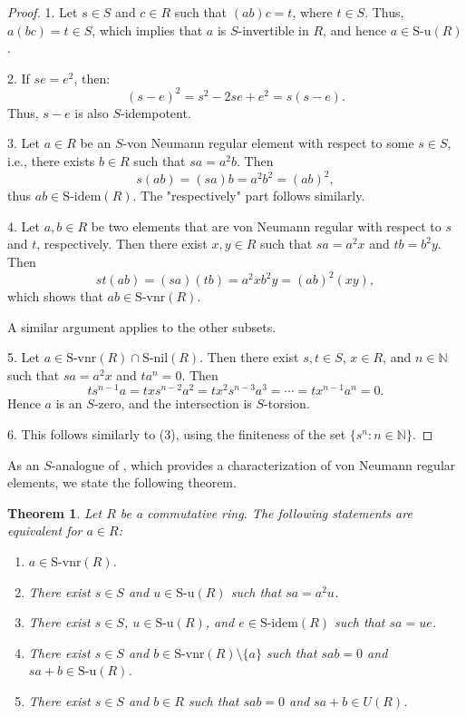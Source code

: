 \documentclass[12pt]{article}
\newtheorem{thm}{\bf Theorem}[section]
\def\Sidem{\mathrm{S\text{-}idem}}
\def\Snil{\mathrm{S\text{-}nil}}
\def\Su{\mathrm{S\text{-}u}}
\def\Svnr{\mathrm{S\text{-}vnr}}
\begin{document}
\begin{proof}

1. Let \( s \in S \) and \( c \in R \) such that \( (ab)c = t \), where \( t \in S \). Thus, \( a(bc) = t \in S \), which implies that \( a \) is $S$-invertible in \( R \), and hence \( a \in \Su(R) \).

2. If \( se = e^2 \), then:
\[
(s - e)^2 = s^2 - 2se + e^2 = s(s - e).
\]
Thus, \( s - e \) is also \( S \)-idempotent.

3. Let \( a \in R \) be an \( S \)-von Neumann regular element with respect to some \( s \in S \), i.e., there exists \( b \in R \) such that \( sa = a^2b \). Then
\[
s(ab) = (sa)b = a^2b^2 = (ab)^2,
\]
thus \( ab \in \Sidem(R) \). The "respectively" part follows similarly.

\medskip

4. Let \( a, b \in R \) be two elements that are von Neumann regular with respect to \( s \) and \( t \), respectively. Then there exist \( x, y \in R \) such that \( sa = a^2x \) and \( tb = b^2y \). Then
\[
st(ab) = (sa)(tb) = a^2x b^2y = (ab)^2(xy),
\]
which shows that \( ab \in \Svnr(R) \). 

A similar argument applies to the other subsets.
\medskip

5. Let \( a \in \Svnr(R) \cap \Snil(R) \). Then there exist \( s, t \in S \), \( x \in R \), and \( n \in \mathbb{N} \) such that \( sa = a^2x \) and \( ta^n = 0 \). Then
\[
 ts^{n-1}a = txs^{n-2}a^2 = tx^2s^{n-3}a^3 = \cdots = tx^{n-1}a^n = 0.
\]
Hence \( a \) is an \( S \)-zero, and the intersection is \( S \)-torsion. 

\medskip

6. This follows similarly to (3), using the finiteness of the set \( \{s^n : n \in \mathbb{N} \} \).
\end{proof}


 
 As an \( S \)-analogue of \cite[Theorem 2.2]{And1}, which provides a characterization of von Neumann regular elements, we state the following theorem.
 
\begin{thm}\label{thm-s-von-ele-char}
Let \( R \) be a commutative ring. The following statements are equivalent for \( a \in R \):
\begin{enumerate}
    \item \( a \in \Svnr(R) \).
    \item There exist \( s \in S \) and \( u \in \Su(R) \) such that \( sa = a^2u \).
    \item There exist \( s \in S \), \( u \in \Su(R) \), and \( e \in \Sidem(R) \) such that \( sa = ue \).
    \item There exist \(s \in S \) and \( b \in \Svnr(R) \setminus \{a\} \) such that \( sab = 0 \) and \( sa + b \in \Su(R) \).
    \item There exist \( s \in S \) and \( b \in R \) such that \( sab = 0 \) and \( sa + b \in U(R) \).
\end{enumerate}
\end{thm}
\end{document}
